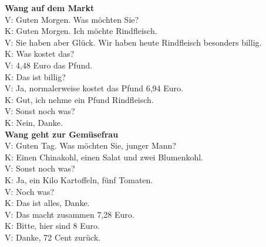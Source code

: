 \textbf{Wang auf dem Markt} \\
V: Guten Morgen. Was möchten Sie? \\
K: Guten Morgen. Ich möchte Rindfleisch. \\
V: Sie haben aber Glück. Wir haben heute Rindfleisch besonders billig. \\
K: Was kostet das? \\
V: 4,48 Euro das Pfund.  \\
K: Das ist billig? \\
V: Ja, normalerweise kostet das Pfund 6,94 Euro.  \\
K: Gut, ich nehme ein Pfund Rindfleisch.  \\
V: Sonst noch was? \\
K: Nein, Danke. \\
\textbf{Wang geht zur Gemüsefrau} \\
V: Guten Tag. Was möchten Sie, junger Mann? \\
K: Einen Chinakohl, einen Salat und zwei Blumenkohl. \\
V: Sonst noch was? \\
K: Ja, ein Kilo Kartoffeln, fünf Tomaten.  \\
V: Noch was? \\
K: Das ist alles, Danke. \\
V: Das macht zusammen 7,28 Euro. \\
K: Bitte, hier sind 8 Euro.  \\
V: Danke, 72 Cent zurück.  \\

